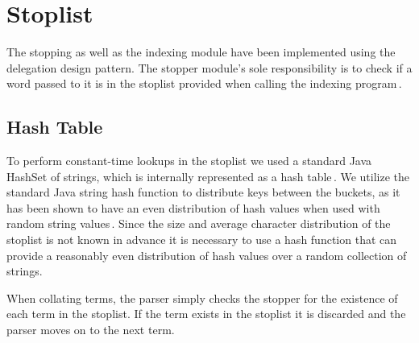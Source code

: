 
\section{Stoplist}
\label{sec:stopping}

The stopping as well as the indexing module have been implemented using the delegation design pattern. The stopper module's sole responsibility is to check if a word passed to it is in the stoplist provided when calling the indexing program\,\cite{princeton}.

\subsection{Hash Table}
To perform constant-time lookups in the stoplist we used a standard Java HashSet of strings, which is internally represented as a hash table\,\cite{hashset}. We utilize the standard Java string hash function to distribute keys between the buckets, as it has been shown to have an even distribution of hash values when used with random string values\,\cite{javamex}. Since the size and average character distribution of the stoplist is not known in advance it is necessary to use a hash function that can provide a reasonably even distribution of hash values over a random collection of strings.

When collating terms, the parser simply checks the stopper for the existence of each term in the stoplist. If the term exists in the stoplist it is discarded and the parser moves on to the next term.
